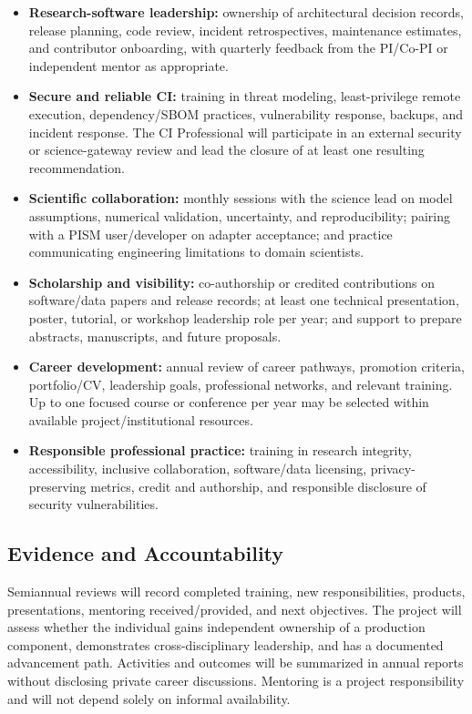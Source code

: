 \begin{itemize}[leftmargin=*]
  \item \textbf{Research-software leadership:} ownership of architectural
  decision records, release planning, code review, incident retrospectives,
  maintenance estimates, and contributor onboarding, with quarterly feedback
  from the PI/Co-PI or independent mentor as appropriate.
  \item \textbf{Secure and reliable CI:} training in threat modeling,
  least-privilege remote execution, dependency/SBOM practices, vulnerability
  response, backups, and incident response. The CI Professional will
  participate in an external security or science-gateway review and lead the
  closure of at least one resulting recommendation.
  \item \textbf{Scientific collaboration:} monthly sessions with the science
  lead on model assumptions, numerical validation, uncertainty, and
  reproducibility; pairing with a PISM user/developer on adapter acceptance;
  and practice communicating engineering limitations to domain scientists.
  \item \textbf{Scholarship and visibility:} co-authorship or credited
  contributions on software/data papers and release records; at least one
  technical presentation, poster, tutorial, or workshop leadership role per
  year; and support to prepare abstracts, manuscripts, and future proposals.
  \item \textbf{Career development:} annual review of career pathways,
  promotion criteria, portfolio/CV, leadership goals, professional networks,
  and relevant training. Up to one focused course or conference per year may
  be selected within available project/institutional resources.
  \item \textbf{Responsible professional practice:} training in research
  integrity, accessibility, inclusive collaboration, software/data licensing,
  privacy-preserving metrics, credit and authorship, and responsible disclosure
  of security vulnerabilities.
\end{itemize}

\subsection*{Evidence and Accountability}

Semiannual reviews will record completed training, new responsibilities,
products, presentations, mentoring received/provided, and next objectives.
The project will assess whether the individual gains independent ownership of
a production component, demonstrates cross-disciplinary leadership, and has a
documented advancement path. Activities and outcomes will be summarized in
annual reports without disclosing private career discussions. Mentoring is a
project responsibility and will not depend solely on informal availability.
